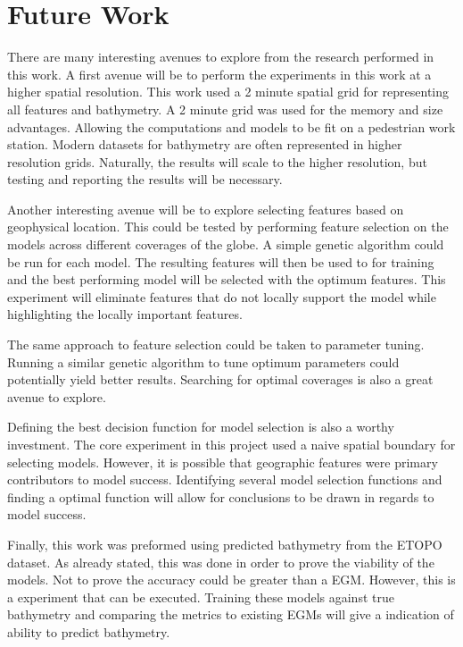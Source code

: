 \section{Future Work}
\setlength{\parindent}{10ex}
There are many interesting avenues to explore from the research performed in this work.
A first avenue will be to perform the experiments in this work at a higher spatial resolution.
This work used a 2 minute spatial grid for representing all features and bathymetry.
A 2 minute grid was used for the memory and size advantages.
Allowing the computations and models to be fit on a pedestrian work station.
Modern datasets for bathymetry are often represented in higher resolution grids.
Naturally, the results will scale to the higher resolution, but testing and reporting the results will be necessary.

\par
Another interesting avenue will be to explore selecting features based on geophysical location.
This could be tested by performing feature selection on the models across different coverages of the globe.
A simple genetic algorithm could be run for each model.
The resulting features will then be used to for training and the best performing model will be selected with the optimum features.
This experiment will eliminate features that do not locally support the model while highlighting the locally important features.

\par
The same approach to feature selection could be taken to parameter tuning.
Running a similar genetic algorithm to tune optimum parameters could potentially yield better results.
Searching for optimal coverages is also a great avenue to explore.

\par 
Defining the best decision function for model selection is also a worthy investment.
The core experiment in this project used a naive spatial boundary for selecting models.
However, it is possible that geographic features were primary contributors to model success.
Identifying several model selection functions and finding a optimal function will allow for conclusions to be drawn in regards to model success.

\par
Finally, this work was preformed using predicted bathymetry from the ETOPO dataset.
As already stated, this was done in order to prove the viability of the models.
Not to prove the accuracy could be greater than a \ac{EGM}.
However, this is a experiment that can be executed.
Training these models against true bathymetry and comparing the metrics to existing \ac{EGM}s will give a indication of ability to predict bathymetry.